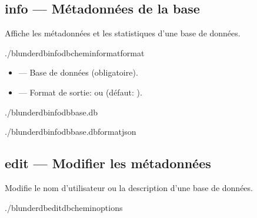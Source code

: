 \documentclass[letterpaper,10pt,french]{sphinxmanual}
\begin{document}
\subsection{info — Métadonnées de la base}
\label{\detokenize{cli:info-metadonnees-de-la-base}}
\sphinxAtStartPar
Affiche les métadonnées et les statistiques d’une base de données.

\begin{sphinxVerbatim}[commandchars=\\\{\}]
./blunderdbinfo\PYGZhy{}\PYGZhy{}db\PYGZlt{}chemin\PYGZgt{}\PYG{o}{[}\PYGZhy{}\PYGZhy{}format\PYGZlt{}format\PYGZgt{}\PYG{o}{]}
\end{sphinxVerbatim}

\sphinxAtStartPar
{}
\begin{itemize}
\item {} 
\sphinxAtStartPar
{} — Base de données (obligatoire).

\item {} 
\sphinxAtStartPar
{} — Format de sortie:  ou  (défaut: ).

\end{itemize}

\sphinxAtStartPar
{}

\begin{sphinxVerbatim}[commandchars=\\\{\}]
./blunderdbinfo\PYGZhy{}\PYGZhy{}dbbase.db

./blunderdbinfo\PYGZhy{}\PYGZhy{}dbbase.db\PYGZhy{}\PYGZhy{}formatjson
\end{sphinxVerbatim}


\subsection{edit — Modifier les métadonnées}
\label{\detokenize{cli:edit-modifier-les-metadonnees}}
\sphinxAtStartPar
Modifie le nom d’utilisateur ou la description d’une base de données.

\begin{sphinxVerbatim}[commandchars=\\\{\}]
./blunderdbedit\PYGZhy{}\PYGZhy{}db\PYGZlt{}chemin\PYGZgt{}\PYG{o}{[}options\PYG{o}{]}
\end{sphinxVerbatim}
\end{document}
